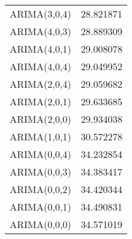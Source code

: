 \begin{tabular}{lr}
ARIMA(3,0,4) & 28.821871 \\
ARIMA(4,0,3) & 28.889309 \\
ARIMA(4,0,1) & 29.008078 \\
ARIMA(4,0,4) & 29.049952 \\
ARIMA(2,0,4) & 29.059682 \\
ARIMA(2,0,1) & 29.633685 \\
ARIMA(2,0,0) & 29.934038 \\
ARIMA(1,0,1) & 30.572278 \\
ARIMA(0,0,4) & 34.232854 \\
ARIMA(0,0,3) & 34.383417 \\
ARIMA(0,0,2) & 34.420344 \\
ARIMA(0,0,1) & 34.490831 \\
ARIMA(0,0,0) & 34.571019 \\
\bottomrule
\end{tabular}
